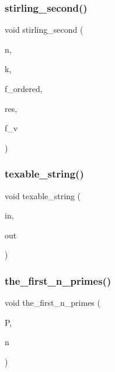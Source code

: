 \subsubsection{\texorpdfstring{stirling\+\_\+second()}{stirling\_second()}}
{\footnotesize\ttfamily void stirling\+\_\+second (\begin{DoxyParamCaption}\item[{\mbox{\hyperlink{galois_8h_a09fddde158a3a20bd2dcadb609de11dc}{I\+NT}}}]{n,  }\item[{\mbox{\hyperlink{galois_8h_a09fddde158a3a20bd2dcadb609de11dc}{I\+NT}}}]{k,  }\item[{\mbox{\hyperlink{galois_8h_a09fddde158a3a20bd2dcadb609de11dc}{I\+NT}}}]{f\+\_\+ordered,  }\item[{\mbox{\hyperlink{classdiscreta__base}{discreta\+\_\+base}} \&}]{res,  }\item[{\mbox{\hyperlink{galois_8h_a09fddde158a3a20bd2dcadb609de11dc}{I\+NT}}}]{f\+\_\+v }\end{DoxyParamCaption})}

\mbox{\label{global_8_c_ad922087122d64d76d195de415553e034}} 
\subsubsection{\texorpdfstring{texable\+\_\+string()}{texable\_string()}}
{\footnotesize\ttfamily void texable\+\_\+string (\begin{DoxyParamCaption}\item[{char $\ast$}]{in,  }\item[{char $\ast$}]{out }\end{DoxyParamCaption})}

\mbox{\label{global_8_c_acbf8077f27bf6ca59b8818bfab1a93f6}} 
\subsubsection{\texorpdfstring{the\+\_\+first\+\_\+n\+\_\+primes()}{the\_first\_n\_primes()}}
{\footnotesize\ttfamily void the\+\_\+first\+\_\+n\+\_\+primes (\begin{DoxyParamCaption}\item[{\mbox{\hyperlink{class_vector}{Vector}} \&}]{P,  }\item[{\mbox{\hyperlink{galois_8h_a09fddde158a3a20bd2dcadb609de11dc}{I\+NT}}}]{n }\end{DoxyParamCaption})}

